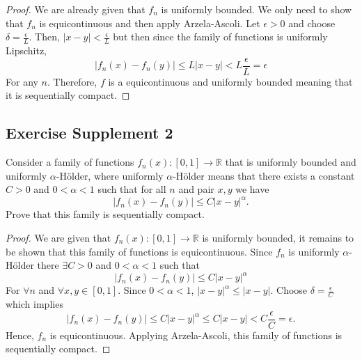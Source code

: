 \documentclass{tufte-book}
\theoremstyle{mytheoremstyle}
\theoremstyle{mylemstyle}
\theoremstyle{mydefstyle}
\begin{document}
\begin{proof}

We are already given that $f_n$ is uniformly bounded.  We only need to show that $f_n$ is equicontinuous and then apply Arzela-Ascoli. Let $\epsilon >0$ and choose $\delta = \frac{\epsilon}{L}$.  Then, $|x-y| <\frac{\epsilon}{L}$ but then since the family of functions is uniformly Lipschitz,
\[|f_n(x) - f_n(y)| \leq L|x-y| < L \frac{\epsilon}{L} = \epsilon \]
For any $n$.  Therefore, $f$ is a equicontinuous and uniformly bounded meaning that it is sequentially compact.
\end{proof}

\subsection{Exercise Supplement 2}
Consider a family of functions $f_n(x): [0,1] \to \mathbb{R}$ that is uniformly bounded and uniformly $\alpha$-H{\"o}lder, where uniformly $\alpha$-H{\"o}lder means that there exists a constant $C>0$ and $0<\alpha<1$ such that for all $n$ and pair $x,y$ we have
\[|f_n(x) - f_n(y)| \leq C|x-y|^\alpha. \]
Prove that this family is sequentially compact.

\begin{proof}
We are given that $f_n(x): [0,1] \to \mathbb{R}$ is uniformly bounded, it remains to be shown that this family of functions is equicontinuous.  Since $f_n$ is uniformly $\alpha$-H{\"o}lder there $\exists C>0$ and $0<\alpha<1$ such that 
\[|f_n(x) - f_n(y)| \leq C|x-y|^\alpha \]
For $\forall n$ and $\forall x,y \in [0,1]$.  Since $0<\alpha<1$, $|x-y|^\alpha \leq |x-y|$.  Choose $\delta = \frac{\epsilon}{C}$ which implies
\[|f_n(x) - f_n(y)| \leq C|x-y|^\alpha \leq C|x-y| < C \frac{\epsilon}{C} = \epsilon .\]
Hence, $f_n$ is equicontinuous.  Applying Arzela-Ascoli, this family of functions is sequentially compact.
\end{proof}
\end{document}
